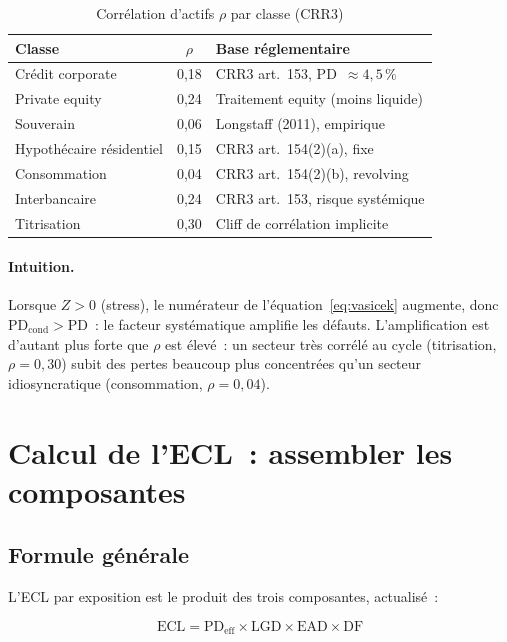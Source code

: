 \documentclass[12pt, a4paper, twoside, openright]{report}
\theoremstyle{definition}
\begin{document}
\begin{table}[htbp]
\centering
\caption{Corrélation d'actifs $\rho$ par classe (CRR3)}
\label{tab:rho-actifs}
\small
\begin{tabular}{lcp{5.5cm}}
\toprule
Classe & $\rho$ & Base réglementaire \\
\midrule
Crédit corporate & 0{,}18 & CRR3 art.~153, PD~$\approx 4{,}5\,\%$ \\
Private equity & 0{,}24 & Traitement equity (moins liquide) \\
Souverain & 0{,}06 & Longstaff (2011), empirique \\
Hypothécaire résidentiel & 0{,}15 & CRR3 art.~154(2)(a), fixe \\
Consommation & 0{,}04 & CRR3 art.~154(2)(b), revolving \\
Interbancaire & 0{,}24 & CRR3 art.~153, risque systémique \\
Titrisation & 0{,}30 & Cliff de corrélation implicite \\
\bottomrule
\end{tabular}
\end{table}

\paragraph{Intuition.} Lorsque $Z > 0$ (stress), le numérateur de l'équation~\eqref{eq:vasicek} augmente, donc $\text{PD}_{\text{cond}} > \text{PD}$~: le facteur systématique amplifie les défauts. L'amplification est d'autant plus forte que $\rho$ est élevé~: un secteur très corrélé au cycle (titrisation, $\rho = 0{,}30$) subit des pertes beaucoup plus concentrées qu'un secteur idiosyncratique (consommation, $\rho = 0{,}04$).

\section{Calcul de l'ECL~: assembler les composantes}
\label{sec:ecl:calcul}

\subsection{Formule générale}

L'ECL par exposition est le produit des trois composantes, actualisé~:

\begin{equation}
\text{ECL} = \text{PD}_{\text{eff}} \times \text{LGD} \times \text{EAD} \times \text{DF}
\label{eq:ecl}
\end{equation}
\end{document}
